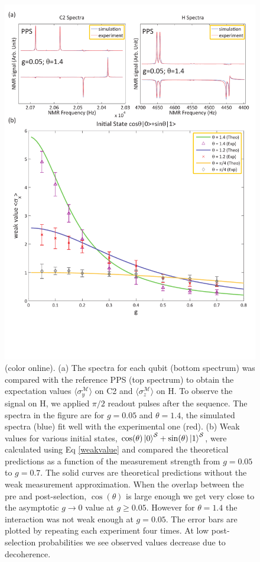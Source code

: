 \documentclass[aps,pra,12pt,onecolumn,showpacs,superscriptaddress,floatfix,footinbib,subfigure]{revtex4}
\def\ket#1{\mathinner{|{#1}\rangle}}
\def\es{{\mathcal{S}}}
\def\md{{\mathcal{M}}}
\begin{document}
\begin{figure}[t] \centering
\includegraphics[width=0.85\columnwidth]{gweak.pdf}
\caption{(color online). (a) The spectra for each qubit (bottom spectrum) was compared with the reference PPS  (top spectrum) to obtain the expectation values $\langle\sigma_y^\md\rangle$ on C2 and $\langle\sigma_z^\md\rangle$ on H.   To observe the signal  on H, we  applied $\pi/2$ readout pulses after the sequence.  The spectra in the figure are for  $g=0.05$ and $\theta = 1.4$, the simulated spectra (blue) fit well with the experimental one (red).   (b) Weak values for various initial states, $\cos(\theta)\ket{0}^\es+\sin(\theta)\ket{1}^\es$,  were calculated using Eq \eqref{weakvalue}  and  compared the theoretical predictions  as a function of the measurement strength  from  $g=0.05$  to $g=0.7$.   The solid curves are theoretical predictions without the weak measurement approximation.  When the overlap between the pre and post-selection, $\cos(\theta)$  is large enough we  get very close to the asymptotic $g\rightarrow 0$  value at $g\ge0.05$.  However for $\theta=1.4$ the interaction was not weak enough at $g=0.05$.  The error bars are plotted by repeating each experiment four times. At low post-selection probabilities  we see observed values decrease  due to decoherence.}\label{gweak}
\end{figure}
\end{document}
